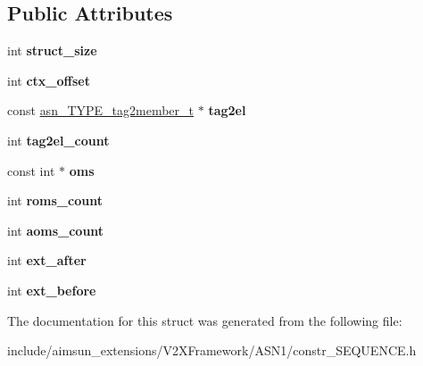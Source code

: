 \subsection*{Public Attributes}
\begin{DoxyCompactItemize}
\item 
int {\bfseries struct\+\_\+size}\hypertarget{structasn__SEQUENCE__specifics__s_a45bfbd26bc54a36d8bb94a27dfdddeab}{}\label{structasn__SEQUENCE__specifics__s_a45bfbd26bc54a36d8bb94a27dfdddeab}

\item 
int {\bfseries ctx\+\_\+offset}\hypertarget{structasn__SEQUENCE__specifics__s_ae6fc81ca5dbc4f5a91d60fe0366119c7}{}\label{structasn__SEQUENCE__specifics__s_ae6fc81ca5dbc4f5a91d60fe0366119c7}

\item 
const \hyperlink{structasn__TYPE__tag2member__s}{asn\+\_\+\+T\+Y\+P\+E\+\_\+tag2member\+\_\+t} $\ast$ {\bfseries tag2el}\hypertarget{structasn__SEQUENCE__specifics__s_a3798278dcde75da87060a567f4bbbb05}{}\label{structasn__SEQUENCE__specifics__s_a3798278dcde75da87060a567f4bbbb05}

\item 
int {\bfseries tag2el\+\_\+count}\hypertarget{structasn__SEQUENCE__specifics__s_a8bd72748029938524a1bea5c8c73b88a}{}\label{structasn__SEQUENCE__specifics__s_a8bd72748029938524a1bea5c8c73b88a}

\item 
const int $\ast$ {\bfseries oms}\hypertarget{structasn__SEQUENCE__specifics__s_a0bbe76bec7ecff31a3234b7fa3414e38}{}\label{structasn__SEQUENCE__specifics__s_a0bbe76bec7ecff31a3234b7fa3414e38}

\item 
int {\bfseries roms\+\_\+count}\hypertarget{structasn__SEQUENCE__specifics__s_a0ec9ecedf8ff6b25a8a4e8b51a0e7b7e}{}\label{structasn__SEQUENCE__specifics__s_a0ec9ecedf8ff6b25a8a4e8b51a0e7b7e}

\item 
int {\bfseries aoms\+\_\+count}\hypertarget{structasn__SEQUENCE__specifics__s_ab3f160f58d19eea92aca727cb5e3fce2}{}\label{structasn__SEQUENCE__specifics__s_ab3f160f58d19eea92aca727cb5e3fce2}

\item 
int {\bfseries ext\+\_\+after}\hypertarget{structasn__SEQUENCE__specifics__s_aa77ae8ec487140bc0b3f82eba3041160}{}\label{structasn__SEQUENCE__specifics__s_aa77ae8ec487140bc0b3f82eba3041160}

\item 
int {\bfseries ext\+\_\+before}\hypertarget{structasn__SEQUENCE__specifics__s_a844b9a047a3b9206713725fb9fdde94b}{}\label{structasn__SEQUENCE__specifics__s_a844b9a047a3b9206713725fb9fdde94b}

\end{DoxyCompactItemize}


The documentation for this struct was generated from the following file\+:\begin{DoxyCompactItemize}
\item 
include/aimsun\+\_\+extensions/\+V2\+X\+Framework/\+A\+S\+N1/constr\+\_\+\+S\+E\+Q\+U\+E\+N\+C\+E.\+h\end{DoxyCompactItemize}
